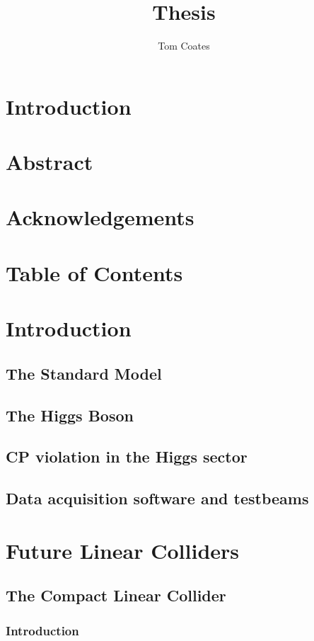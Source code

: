 \documentclass[]{article}
\title{Thesis}
\author{Tom Coates}
\begin{document}
\section{Introduction}

\section{Abstract}

\section{Acknowledgements}

\section{Table of Contents}

\section{Introduction}

\subsection{The Standard Model}

\subsection{The Higgs Boson}

\subsection{CP violation in the Higgs sector}

\subsection{Data acquisition software and testbeams}

\section{Future Linear Colliders}

\subsection{The Compact Linear Collider}
\subsubsection{Introduction}
\end{document}
